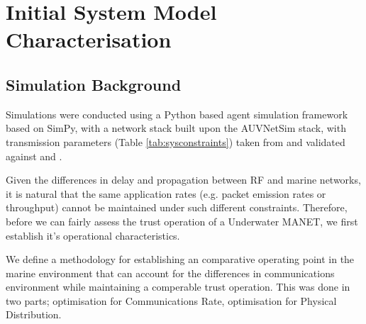 \documentclass[runningheads,a4paper]{llncs}
\begin{document}
\section{Initial System Model Characterisation}\label{sec:initialsystemcharacterisation}

\subsection{Simulation Background}

Simulations were conducted using a Python based agent simulation framework based on SimPy\cite{Mueller2003SimPy}, with a network stack built upon the AUVNetSim stack\cite{Miquel2008}, with transmission parameters (Table \ref{tab:sysconstraints}) taken from and validated against \cite{Stojanovic2007} and \cite{Stefanov2011}.

Given the differences in delay and propagation between RF and marine networks, it is natural that the same application rates (e.g. packet emission rates or throughput) cannot be maintained under such different constraints.
Therefore, before we can fairly assess the trust operation of a Underwater MANET, we first establish it's operational characteristics.

We define a methodology for establishing an comparative operating point in the marine environment that can account for the differences in communications environment while maintaining a comperable trust operation.
This was done in two parts; optimisation for Communications Rate, optimisation for Physical Distribution.
\end{document}
